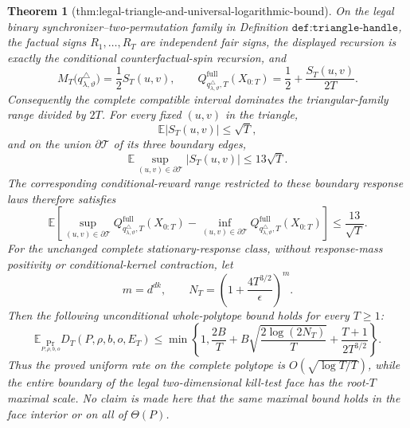 \documentclass{article}
\newtheorem{theorem}{Theorem}
\begin{document}
\begin{theorem}[thm:legal-triangle-and-universal-logarithmic-bound]\label{thm:legal-triangle-and-universal-logarithmic-bound}
On the legal binary synchronizer--two-permutation family in Definition \(\texttt{def:triangle-handle}\), the factual signs \(R_1,\ldots,R_T\) are independent fair signs, the displayed recursion is exactly the conditional counterfactual-spin recursion, and
\[
 M_T\bigl(q^{\triangle}_{\lambda,\vartheta}\bigr)
 =\frac12 S_T(u,v),\qquad
 Q^{\mathrm{full}}_{q^{\triangle}_{\lambda,\vartheta},T}(X_{0:T})
 =\frac12+\frac{S_T(u,v)}{2T}.
\]
Consequently the complete compatible interval dominates the triangular-family range divided by \(2T\).  For every fixed \((u,v)\) in the triangle,
\[
 \mathbb E|S_T(u,v)|\leq\sqrt T,
\]
and on the union \(\partial\mathcal T\) of its three boundary edges,
\[
 \mathbb E\sup_{(u,v)\in\partial\mathcal T}|S_T(u,v)|\leq13\sqrt T.
\]
The corresponding conditional-reward range restricted to these boundary response laws therefore satisfies
\[
 \mathbb E\left[
 \sup_{(u,v)\in\partial\mathcal T}Q^{\mathrm{full}}_{q^{\triangle}_{\lambda,\vartheta},T}(X_{0:T})
 -\inf_{(u,v)\in\partial\mathcal T}Q^{\mathrm{full}}_{q^{\triangle}_{\lambda,\vartheta},T}(X_{0:T})
 \right]\leq\frac{13}{\sqrt T}.
\]
For the unchanged complete stationary-response class, without response-mass positivity or conditional-kernel contraction, let
\[
 m=d^{dk},\qquad
 N_T=\left(1+\frac{4T^{3/2}}{\epsilon}\right)^m.
\]
Then the following unconditional whole-polytope bound holds for every \(T\geq1\):
\[
 \mathbb E_{\Pr_{P,\rho,b,o}}D_T(P,\rho,b,o,E_T)
 \leq
 \min\left\{1,\frac{2B}{T}
 +B\sqrt{\frac{2\log(2N_T)}{T}}
 +\frac{T+1}{2T^{3/2}}\right\}.
\]
Thus the proved uniform rate on the complete polytope is \(O(\sqrt{\log T/T})\), while the entire boundary of the legal two-dimensional kill-test face has the root-\(T\) maximal scale.  No claim is made here that the same maximal bound holds in the face interior or on all of \(\Theta(P)\).
\end{theorem}
\end{document}
